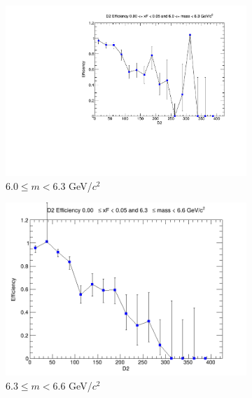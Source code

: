 \documentclass[11pt]{article}
\begin{document}
\begin{figure}[p]
\begin{subfigure}[b]{0.32\textwidth}
        \includegraphics[width=\textwidth]{./kTrackerEfficiencyPlots/D2_Efficiency_xF0_mass6.pdf}
        \caption{$6.0 \leq m < 6.3$ GeV/$c^2$}
    \end{subfigure}\hfill
    \begin{subfigure}[b]{0.32\textwidth}
        \centering
        \includegraphics[width=\textwidth]{./kTrackerEfficiencyPlots/D2_Efficiency_xF0_mass7.png}
        \caption{$6.3 \leq m < 6.6$ GeV/$c^2$}
    \end{subfigure}\hfill
    \begin{subfigure}[b]{0.32\textwidth}
        \centering

\end{subfigure}
\end{figure}
\end{document}
